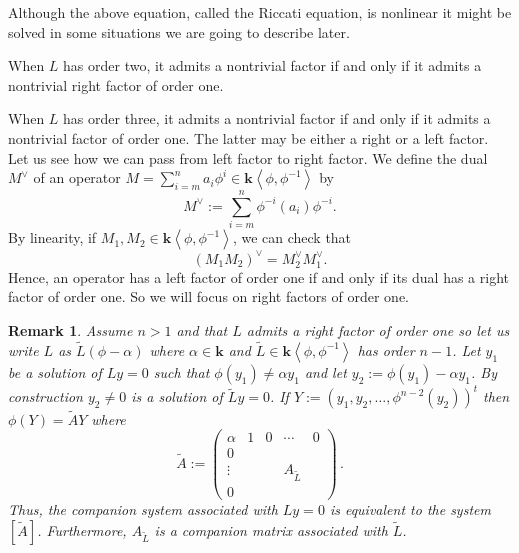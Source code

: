 \documentclass[a4paper,11pt]{amsart}
\newtheorem{rem}[thm]{Remark}
\def\k{\mathbf{k}}
\begin{document}
Although the above equation,  called the Riccati equation,   is nonlinear it might be solved in some situations we are going to describe later.\par 
When $L$ has order two,  it admits a nontrivial factor if and only if it admits a nontrivial right factor of order one. \par
When $L$ has order three, it admits a nontrivial factor if and only if it admits a nontrivial factor of order one.  The latter may be either a right or a left factor.  Let us see how we can pass from left factor to right factor.   
 We define the dual $M^{\vee} $ of an operator $M=\sum_{i=m}^{n}   a_{i}\phi^{i} \in\k\left< \phi,\phi^{-1}\right>$ by 
$$
M^{\vee} := \sum_{i=m}^{n}  \phi^{-i} (a_{i})
\phi^{-i}.$$ 
By linearity, if $M_1, M_2\in \k\left< \phi,\phi^{-1}\right>$, we can check that
$$
 (M_1 M_2)^{\vee}=M_2^{\vee}M_1^{\vee}. 
$$
Hence, an operator has a left factor of order one if and only if its dual has a right factor of order one.   So we will focus on right factors of order one. 

\begin{rem}
\label{rem:rightFactorOrder1}
Assume $n>1$ and that $L$ admits a right factor of order one so let us write $L$ as 
$\widetilde{L}(\phi-\alpha)$ where $\alpha\in \k$ and  $\widetilde{L}\in\k\left< \phi,\phi^{-1}\right>$ has order $n-1$.  
Let $y_1$ be a solution of $Ly=0$ such that $\phi(y_1)\neq \alpha y_1$ and let $y_2:=\phi(y_1)-\alpha y_1$. By construction $y_2\neq 0$ is a solution of $\widetilde{L}y=0$. If $Y:=\left(y_1,y_2,\ldots,\phi^{n-2}(y_2)\right)^t$ then $\phi(Y)=\widetilde{A}Y$ where
$$
\widetilde{A}:=\left(\begin{array}{c|cccc}
\alpha &  1 & 0 & \cdots & 0 \\
\hline
0 & & & &  \\
\vdots & & & A_{\widetilde{L}}&  \\
0 & & & & 
\end{array}\right)\, .
$$
Thus, the companion system associated with $Ly=0$ is equivalent to the system $[\widetilde{A}]$.  Furthermore, $A_{\widetilde{L}}$ is a companion matrix associated with $\widetilde{L}$.\end{rem}
\end{document}
